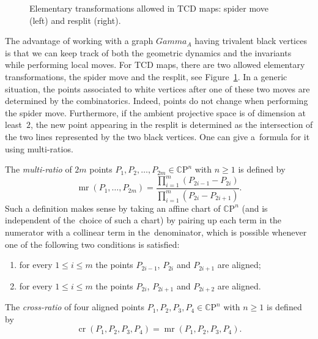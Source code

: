 \documentclass[10pt,a4paper]{amsart}
\numberwithin{equation}{section}
\newcommand{\CP}{{\mathbb C\mathrm P}}
\newcommand{\A}{{\mathbb A}}
\def\cro{\operatorname{cr}}
\def\mr{\operatorname{mr}}
\def\A{A}
\def\Gamma{Gamma}
\begin{document}
\begin{figure}[ht]
		
		\caption{Elementary transformations allowed in TCD maps: spider move (left) and resplit (right).}\label{fig:localmoves}
	\end{figure}
	
	The advantage of working with a graph $\Gamma_\A$ having trivalent black vertices is that we can keep track of both the geometric dynamics and the invariants while performing local moves. For TCD maps, there are two allowed elementary transformations, the spider move and the resplit, see Figure~\ref{fig:localmoves}. In a generic situation, the points associated to white vertices after one of these two moves are determined by the combinatorics. Indeed, points do not change when performing the spider move. Furthermore, if the ambient projective space is of dimension at least~$2$, the new point appearing in the resplit is determined as the intersection of the two lines represented by the two black vertices. One can give a~formula for it using multi-ratios.
	
	The \emph{multi-ratio} of $2m$ points $P_1,P_2,\dots,P_{2m}\in \CP^n$ with $n\geq1$ is defined by
	\[
\mr(P_1,\dots,P_{2m})=\frac{\prod\limits_{i=1}^m (P_{2i-1}-P_{2i})}{\prod\limits_{i=1}^m (P_{2i}-P_{2i+1})}.
	\]
	Such a definition makes sense by taking an affine chart of $\CP^n$ (and is independent of the~choice of such a chart) by pairing up each term in the numerator with a collinear term in the~denominator, which is possible whenever one of the following two conditions is satisfied:
	\begin{enumerate}\itemsep=0pt
		\item[(1)] for every $1\leq i\leq m$ the points $P_{2i-1}$, $P_{2i}$ and $P_{2i+1}$ are aligned;
		\item[(2)] for every $1\leq i\leq m$ the points $P_{2i}$, $P_{2i+1}$ and $P_{2i+2}$ are aligned.
	\end{enumerate}
	The \emph{cross-ratio} of four aligned points $P_1,P_2,P_3,P_4\in \CP^n$ with $n\geq1$ is defined by
	\[
		\cro(P_1,P_2,P_3,P_4)=\mr(P_1,P_2,P_3,P_4).
	\]
	
\end{document}
